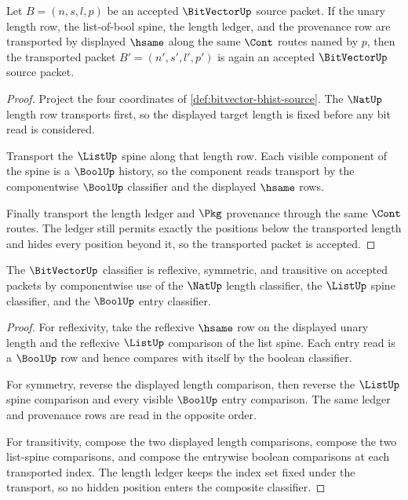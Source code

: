 \begin{theorem}\label{thm:bitvector-carrier-stability}
Let $B=(n,s,l,p)$ be an accepted $\BitVectorUp$ source packet. If the unary
length row, the list-of-bool spine, the length ledger, and the provenance row
are transported by displayed $\hsame$ along the same $\Cont$ routes named by
$p$, then the transported packet $B'=(n',s',l',p')$ is again an accepted
$\BitVectorUp$ source packet.
\end{theorem}
\begin{proof}
Project the four coordinates of \autoref{def:bitvector-bhist-source}. The
$\NatUp$ length row transports first, so the displayed target length is fixed
before any bit read is considered.

Transport the $\ListUp$ spine along that length row. Each visible component of
the spine is a $\BoolUp$ history, so the component reads transport by the
componentwise $\BoolUp$ classifier and the displayed $\hsame$ rows.

Finally transport the length ledger and $\Pkg$ provenance through the same
$\Cont$ routes. The ledger still permits exactly the positions below the
transported length and hides every position beyond it, so the transported
packet is accepted.
\end{proof}

\begin{theorem}\label{thm:bitvector-classifier-laws}
The $\BitVectorUp$ classifier is reflexive, symmetric, and transitive on
accepted packets by componentwise use of the $\NatUp$ length classifier, the
$\ListUp$ spine classifier, and the $\BoolUp$ entry classifier.
\end{theorem}
\begin{proof}
For reflexivity, take the reflexive $\hsame$ row on the displayed unary length
and the reflexive $\ListUp$ comparison of the list spine. Each entry read is a
$\BoolUp$ row and hence compares with itself by the boolean classifier.

For symmetry, reverse the displayed length comparison, then reverse the
$\ListUp$ spine comparison and every visible $\BoolUp$ entry comparison. The
same ledger and provenance rows are read in the opposite order.

For transitivity, compose the two displayed length comparisons, compose the two
list-spine comparisons, and compose the entrywise boolean comparisons at each
transported index. The length ledger keeps the index set fixed under the
transport, so no hidden position enters the composite classifier.
\end{proof}

